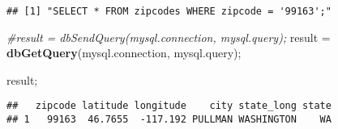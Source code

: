 \documentclass[
]{article}
\newenvironment{Shaded}{\begin{snugshade}}{\end{snugshade}}
\newcommand{\CommentTok}[1]{\textcolor[rgb]{0.56,0.35,0.01}{\textit{#1}}}
\newcommand{\KeywordTok}[1]{\textcolor[rgb]{0.13,0.29,0.53}{\textbf{#1}}}
\newcommand{\NormalTok}[1]{#1}
\newcommand{\StringTok}[1]{\textcolor[rgb]{0.31,0.60,0.02}{#1}}
\begin{document}
\begin{verbatim}
## [1] "SELECT * FROM zipcodes WHERE zipcode = '99163';"
\end{verbatim}

\begin{Shaded}
\begin{Highlighting}[]
\CommentTok{\#result = dbSendQuery(mysql.connection, mysql.query);}
\NormalTok{result =}\StringTok{ }\KeywordTok{dbGetQuery}\NormalTok{(mysql.connection, mysql.query);}

\NormalTok{result;}
\end{Highlighting}
\end{Shaded}

\begin{verbatim}
##   zipcode latitude longitude    city state_long state
## 1   99163  46.7655  -117.192 PULLMAN WASHINGTON    WA
\end{verbatim}
\end{document}
